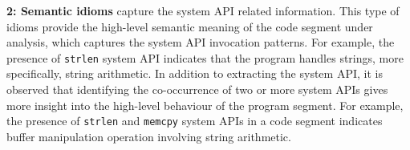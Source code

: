 \noindent \textbf{2: Semantic idioms} capture the system API related information.
This type of idioms provide the high-level semantic meaning of the code segment under analysis, which captures the system API invocation patterns. %
For example, the presence of \texttt{strlen} system API indicates that the program handles strings, more specifically, string arithmetic. In addition to extracting the system API, it is observed that identifying the co-occurrence of two or more system APIs gives more insight into the high-level behaviour of the program segment. For example, the presence of \texttt{strlen} and \texttt{memcpy} system APIs in a code segment indicates buffer manipulation operation involving string arithmetic.


